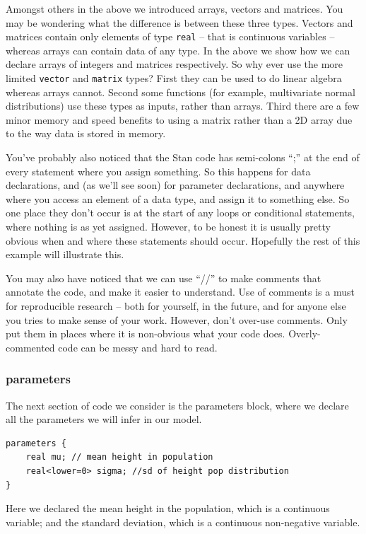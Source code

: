 \documentclass[11pt,fullpage]{book}
\begin{document}
Amongst others in the above we introduced arrays, vectors and matrices. You may be wondering what the difference is between these three types. Vectors and matrices contain only elements of type \texttt{real} -- that is continuous variables -- whereas arrays can contain data of any type. In the above we show how we can declare arrays of integers and matrices respectively. So why ever use the more limited \texttt{vector} and \texttt{matrix} types? First they can be used to do linear algebra whereas arrays cannot. Second some functions (for example, multivariate normal distributions) use these types as inputs, rather than arrays. Third there are a few minor memory and speed benefits to using a matrix rather than a 2D array due to the way data is stored in memory.

You've probably also noticed that the Stan code has semi-colons ``;'' at the end of every statement where you assign something. So this happens for data declarations, and (as we'll see soon) for parameter declarations, and anywhere where you access an element of a data type, and assign it to something else. So one place they don't occur is at the start of any loops or conditional statements, where nothing is as yet assigned. However, to be honest it is usually pretty obvious when and where these statements should occur. Hopefully the rest of this example will illustrate this.

You may also have noticed that we can use ``//'' to make comments that annotate the code, and make it easier to understand. Use of comments is a must for reproducible research -- both for yourself, in the future, and for anyone else you tries to make sense of your work. However, don't over-use comments. Only put them in places where it is non-obvious what your code does. Overly-commented code can be messy and hard to read. 

\subsubsection{parameters}
The next section of code we consider is the parameters block, where we declare all the parameters we will infer in our model.
\begin{verbatim}
parameters {
    real mu; // mean height in population
    real<lower=0> sigma; //sd of height pop distribution
}
\end{verbatim}
Here we declared the mean height in the population, which is a continuous variable; and the standard deviation, which is a continuous non-negative variable. 
\end{document}
